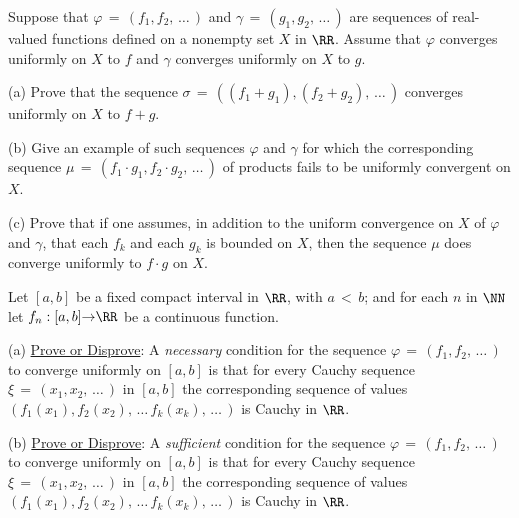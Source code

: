 
\V
\V

\noindent \ExFk Suppose that ${\varphi} \,=\, (f_{1},f_{2},\,{\ldots}\,)$ and ${\gamma} \,=\, (g_{1},g_{2},\,{\ldots}\,)$ are sequences of real-valued functions defined on a nonempty set $X$ in ${\RR}$.
    Assume that ${\varphi}$ converges uniformly on $X$ to $f$ and ${\gamma}$ converges uniformly on $X$ to $g$.

\V

        (a) Prove that the sequence ${\sigma} \,=\, ((f_{1}+g_{1}), (f_{2}+g_{2}),\,{\ldots}\,)$ converges uniformly on $X$ to $f+g$.

\V

        (b) Give an example of such sequences ${\varphi}$ and ${\gamma}$ for which the corresponding sequence ${\mu} \,=\, (f_{1}{\cdot}g_{1}, f_{2}{\cdot}g_{2},\,{\ldots}\,)$ of products fails to be uniformly convergent on $X$.

\V

        (c) Prove that if one assumes, in addition to the uniform convergence on $X$ of ${\varphi}$ and ${\gamma}$,
    that each $f_{k}$ and each $g_{k}$ is bounded on $X$, then the sequence ${\mu}$ does converge uniformly to $f{\cdot}g$ on $X$.


\V
\V

\noindent \ExFl Let $[a,b]$ be a fixed compact interval in ${\RR}$, with $a \,<\, b$;
    and for each $n$ in ${\NN}$ let $f_{n}:[a,b] {\rightarrow} {\RR}$ be a continuous function.

\V

        (a) \underline{Prove or Disprove}: A {\em necessary} condition for the sequence ${\varphi}\,=\, (f_{1}, f_{2}, \,{\ldots}\,)$ to converge uniformly on $[a,b]$
    is that for every Cauchy sequence ${\xi}\,=\, (x_{1}, x_{2}, \,{\ldots}\,) $ in $[a,b]$ the corresponding sequence of values
    $(f_{1}(x_{1}), f_{2}(x_{2}), \,{\ldots}\,f_{k}(x_{k}),\,{\ldots}\,)$ is Cauchy in ${\RR}$.

\V

        (b) \underline{Prove or Disprove}: A {\em sufficient} condition for the sequence ${\varphi}\,=\, (f_{1}, f_{2}, \,{\ldots}\,)$ to converge uniformly on $[a,b]$
    is that for every Cauchy sequence ${\xi}\,=\, (x_{1}, x_{2}, \,{\ldots}\,) $ in $[a,b]$ the corresponding sequence of values
    $(f_{1}(x_{1}), f_{2}(x_{2}), \,{\ldots}\,f_{k}(x_{k}),\,{\ldots}\,)$ is Cauchy in ${\RR}$.

